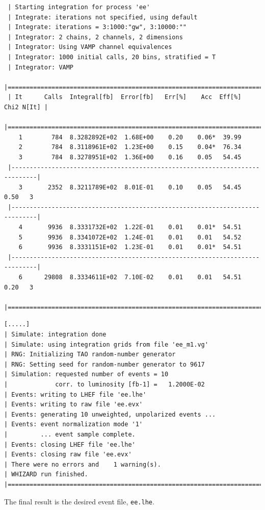 \documentclass[12pt]{book}
\newcommand{\ttt}[1]{\texttt{#1}}
\begin{document}
\begin{footnotesize}
 \begin{verbatim}
 | Starting integration for process 'ee'
 | Integrate: iterations not specified, using default
 | Integrate: iterations = 3:1000:"gw", 3:10000:""
 | Integrator: 2 chains, 2 channels, 2 dimensions
 | Integrator: Using VAMP channel equivalences
 | Integrator: 1000 initial calls, 20 bins, stratified = T
 | Integrator: VAMP
 |=============================================================================|
 | It      Calls  Integral[fb]  Error[fb]   Err[%]    Acc  Eff[%]   Chi2 N[It] |
 |=============================================================================|
    1        784  8.3282892E+02  1.68E+00    0.20    0.06*  39.99
    2        784  8.3118961E+02  1.23E+00    0.15    0.04*  76.34
    3        784  8.3278951E+02  1.36E+00    0.16    0.05   54.45
 |-----------------------------------------------------------------------------|
    3       2352  8.3211789E+02  8.01E-01    0.10    0.05   54.45    0.50   3
 |-----------------------------------------------------------------------------|
    4       9936  8.3331732E+02  1.22E-01    0.01    0.01*  54.51
    5       9936  8.3341072E+02  1.24E-01    0.01    0.01   54.52
    6       9936  8.3331151E+02  1.23E-01    0.01    0.01*  54.51
 |-----------------------------------------------------------------------------|
    6      29808  8.3334611E+02  7.10E-02    0.01    0.01   54.51    0.20   3
 |=============================================================================|
 \end{verbatim}

 \begin{verbatim}
[.....]
| Simulate: integration done
| Simulate: using integration grids from file 'ee_m1.vg'
| RNG: Initializing TAO random-number generator
| RNG: Setting seed for random-number generator to 9617
| Simulation: requested number of events = 10
|             corr. to luminosity [fb-1] =   1.2000E-02
| Events: writing to LHEF file 'ee.lhe'
| Events: writing to raw file 'ee.evx'
| Events: generating 10 unweighted, unpolarized events ...
| Events: event normalization mode '1'
|         ... event sample complete.
| Events: closing LHEF file 'ee.lhe'
| Events: closing raw file 'ee.evx'
| There were no errors and    1 warning(s).
| WHIZARD run finished.
|=============================================================================|
 \end{verbatim}
 \end{footnotesize}
The final result is the desired event file, \ttt{ee.lhe}.
\end{document}
